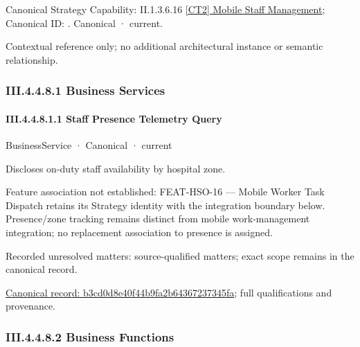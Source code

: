 {\small Canonical Strategy Capability: II.1.3.6.16 \hyperref[element:79a4a48fddf74c69acf7e16404d06ea5]{[CT2] Mobile Staff Management}; Canonical ID: \texttt{}. Canonical · current.}\par
Contextual reference only; no additional architectural instance or semantic relationship.\par
\subsubsection*{III.4.4.8.1 Business Services}
\label{navigation:III.4.4.8.1}

\paragraph*{III.4.4.8.1.1 Staff Presence Telemetry Query}
\label{navigation:III.4.4.8.1.1}

\label{element:b3cd0d8e40f44b9fa2b64367237345fa}
{\small BusinessService · Canonical · current}\par

Discloses on-duty staff availability by hospital zone.



Feature association not established: FEAT-HSO-16 — Mobile Worker Task Dispatch retains its Strategy identity with the integration boundary below. Presence/zone tracking remains distinct from mobile work-management integration; no replacement association to presence is assigned.


{\small Recorded unresolved matters: source-qualified matters; exact scope remains in the canonical record.}\par
{\footnotesize \href{../../../../continuum/business/business-service/b3cd0d8e40f44b9fa2b64367237345fa.md}{Canonical record: b3cd0d8e40f44b9fa2b64367237345fa}; full qualifications and provenance.}\par
\subsubsection*{III.4.4.8.2 Business Functions}
\label{navigation:III.4.4.8.2}

